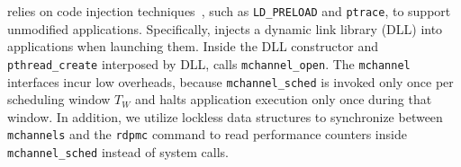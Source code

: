 \sys relies on code injection techniques~\cite{ci-wiki}, such as \texttt{LD\_PRELOAD} and \texttt{ptrace}, to support unmodified applications. Specifically, \sys injects a dynamic link library (DLL) into applications when launching them. Inside the DLL constructor and \texttt{pthread\_create} interposed by DLL, \sys calls \texttt{mchannel\_open}.
The \texttt{mchannel} interfaces incur low overheads,
because \texttt{mchannel\_sched} is invoked only once per scheduling window $T_W$ and halts application execution only once during that window. In addition, we utilize lockless data structures to synchronize between \texttt{mchannels} and the \texttt{rdpmc} command to read performance counters inside \texttt{mchannel\_sched} instead of system calls.





